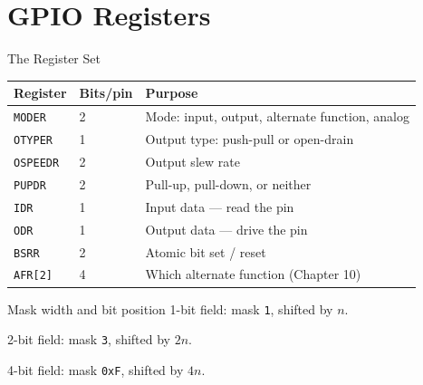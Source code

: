 \documentclass[9pt,aspectratio=169,xcolor=table]{beamer}
\begin{document}
\section{GPIO Registers}

\begin{frame}{The Register Set}
    \begin{center}
    {\normalsize
    \striped
    \begin{tabular}{@{}l l R{.50\textwidth}@{}}
        \toprule
        \textbf{Register} & \textbf{Bits/pin} & \textbf{Purpose} \\
        \midrule
        \texttt{MODER}   & 2 & Mode: input, output, alternate function, analog \\
        \texttt{OTYPER}  & 1 & Output type: push-pull or open-drain \\
        \texttt{OSPEEDR} & 2 & Output slew rate \\
        \texttt{PUPDR}   & 2 & Pull-up, pull-down, or neither \\
        \texttt{IDR}     & 1 & {Input} data --- read the pin \\
        \texttt{ODR}     & 1 & {Output} data --- drive the pin \\
        \texttt{BSRR}    & 2 & Atomic bit set / reset \\
        \texttt{AFR[2]}  & 4 & Which alternate function (Chapter 10) \\
        \bottomrule
    \end{tabular}}
    \end{center}

    \vspace{2mm}
\begin{block}{Mask width and bit position}
	1-bit field: mask \texttt{1}, shifted by $n$.

	2-bit field: mask \texttt{3}, shifted by $2n$.

	4-bit field: mask \texttt{0xF}, shifted by $4n$.
\end{block}
\end{frame}
\end{document}
